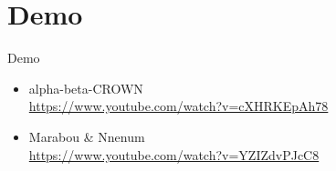 \documentclass[9pt]{beamer}
\begin{document}
\section{Demo}
\begin{frame}[plain,c]{Demo}
\begin{itemize}
    \item alpha-beta-CROWN\\
    \url{https://www.youtube.com/watch?v=cXHRKEpAh78}
    \item Marabou \& Nnenum\\
    \url{https://www.youtube.com/watch?v=YZIZdvPJcC8}
\end{itemize}
\end{frame}
\end{document}

